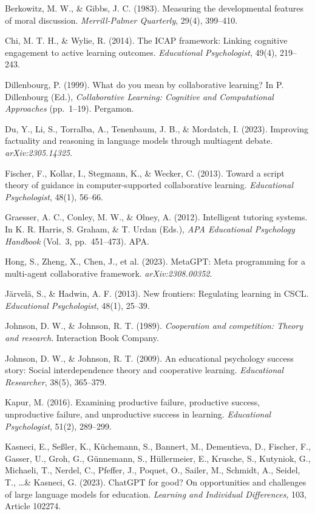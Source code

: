 \documentclass[
  11pt,
]{article}
\begin{document}
Berkowitz, M. W., \& Gibbs, J. C. (1983). Measuring the developmental features of moral discussion. \emph{Merrill-Palmer Quarterly}, 29(4), 399--410.

Chi, M. T. H., \& Wylie, R. (2014). The ICAP framework: Linking cognitive engagement to active learning outcomes. \emph{Educational Psychologist}, 49(4), 219--243.

Dillenbourg, P. (1999). What do you mean by collaborative learning? In P. Dillenbourg (Ed.), \emph{Collaborative Learning: Cognitive and Computational Approaches} (pp.\ 1--19). Pergamon.

Du, Y., Li, S., Torralba, A., Tenenbaum, J. B., \& Mordatch, I. (2023). Improving factuality and reasoning in language models through multiagent debate. \emph{arXiv:2305.14325}.

Fischer, F., Kollar, I., Stegmann, K., \& Wecker, C. (2013). Toward a script theory of guidance in computer-supported collaborative learning. \emph{Educational Psychologist}, 48(1), 56--66.

Graesser, A. C., Conley, M. W., \& Olney, A. (2012). Intelligent tutoring systems. In K. R. Harris, S. Graham, \& T. Urdan (Eds.), \emph{APA Educational Psychology Handbook} (Vol.\ 3, pp.\ 451--473). APA.

Hong, S., Zheng, X., Chen, J., et al. (2023). MetaGPT: Meta programming for a multi-agent collaborative framework. \emph{arXiv:2308.00352}.

Järvelä, S., \& Hadwin, A. F. (2013). New frontiers: Regulating learning in CSCL. \emph{Educational Psychologist}, 48(1), 25--39.

Johnson, D. W., \& Johnson, R. T. (1989). \emph{Cooperation and competition: Theory and research}. Interaction Book Company.

Johnson, D. W., \& Johnson, R. T. (2009). An educational psychology success story: Social interdependence theory and cooperative learning. \emph{Educational Researcher}, 38(5), 365--379.

Kapur, M. (2016). Examining productive failure, productive success, unproductive failure, and unproductive success in learning. \emph{Educational Psychologist}, 51(2), 289--299.

Kasneci, E., Seßler, K., Küchemann, S., Bannert, M., Dementieva, D., Fischer, F., Gasser, U., Groh, G., Günnemann, S., Hüllermeier, E., Krusche, S., Kutyniok, G., Michaeli, T., Nerdel, C., Pfeffer, J., Poquet, O., Sailer, M., Schmidt, A., Seidel, T., \ldots \& Kasneci, G. (2023). ChatGPT for good? On opportunities and challenges of large language models for education. \emph{Learning and Individual Differences}, 103, Article 102274.
\end{document}
